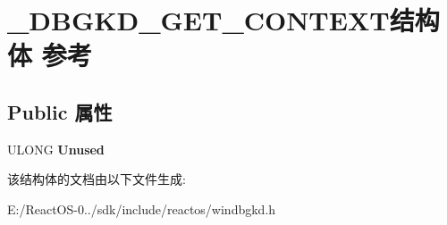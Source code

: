 \hypertarget{struct___d_b_g_k_d___g_e_t___c_o_n_t_e_x_t}{}\section{\+\_\+\+D\+B\+G\+K\+D\+\_\+\+G\+E\+T\+\_\+\+C\+O\+N\+T\+E\+X\+T结构体 参考}
\label{struct___d_b_g_k_d___g_e_t___c_o_n_t_e_x_t}
\subsection*{Public 属性}
\begin{DoxyCompactItemize}
\item 
\mbox{\label{struct___d_b_g_k_d___g_e_t___c_o_n_t_e_x_t_a8f6739885e8f8fade90031380602bebc}} 
U\+L\+O\+NG {\bfseries Unused}
\end{DoxyCompactItemize}


该结构体的文档由以下文件生成\+:\begin{DoxyCompactItemize}
\item 
E\+:/\+React\+O\+S-\/0../sdk/include/reactos/windbgkd.\+h\end{DoxyCompactItemize}
